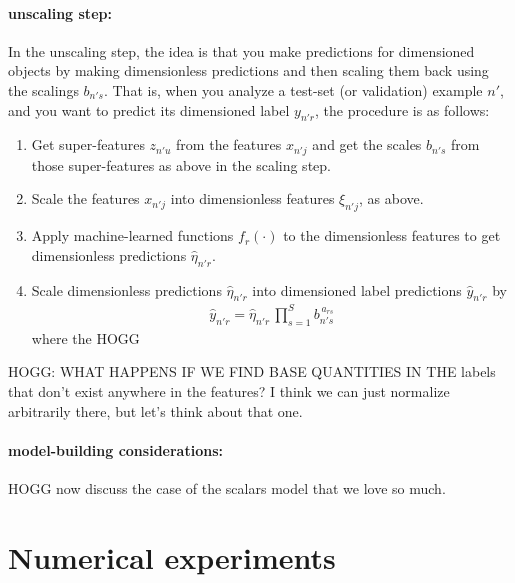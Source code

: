 \documentclass[12pt, letterpaper]{article}
\begin{document}
\paragraph{unscaling step:}
In the unscaling step, the idea is that you make predictions for dimensioned objects by making dimensionless predictions and then scaling them back using the scalings $b_{n's}$.
That is, when you analyze a test-set (or validation) example $n'$, and you want to predict its dimensioned label $y_{n'r}$, the procedure is as follows:
\begin{enumerate}
    \item Get super-features $z_{n'u}$ from the features $x_{n'j}$ and get the scales $b_{n's}$ from those super-features as above in the scaling step.
    \item Scale the features $x_{n'j}$ into dimensionless features $\xi_{n'j}$, as above.
    \item Apply machine-learned functions $f_r(\cdot)$ to the dimensionless features to get dimensionless predictions $\hat{\eta}_{n'r}$.
    \item Scale dimensionless predictions $\hat{\eta}_{n'r}$ into dimensioned label predictions $\hat{y}_{n'r}$ by
    \begin{align}
        \hat{y}_{n'r} = \hat{\eta}_{n'r}\,\prod_{s=1}^S b_{n's}^{\,a_{rs}}
    \end{align}
    where the HOGG
\end{enumerate}

HOGG: WHAT HAPPENS IF WE FIND BASE QUANTITIES IN THE labels that don't exist anywhere in the features? I think we can just normalize arbitrarily there, but let's think about that one.

\paragraph{model-building considerations:}
HOGG now discuss the case of the scalars model that we love so much.

\section{Numerical experiments}
\end{document}
